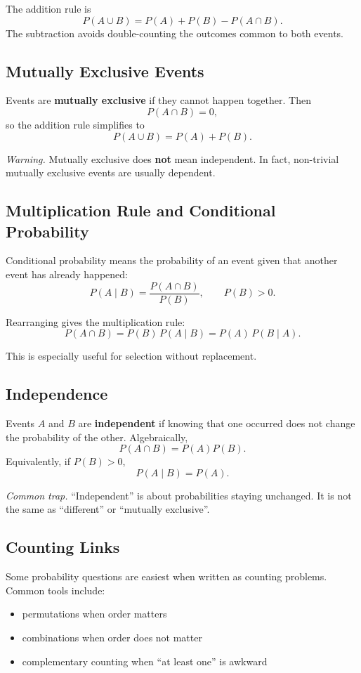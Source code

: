 The addition rule is
\[
P(A\cup B)=P(A)+P(B)-P(A\cap B).
\]
The subtraction avoids double-counting the outcomes common to both events.

\subsection{Mutually Exclusive Events}

Events are \textbf{mutually exclusive} if they cannot happen together. Then
\[
P(A\cap B)=0,
\]
so the addition rule simplifies to
\[
P(A\cup B)=P(A)+P(B).
\]

\textit{Warning.} Mutually exclusive does \textbf{not} mean independent. In fact, non-trivial mutually exclusive events are usually dependent.

\subsection{Multiplication Rule and Conditional Probability}

Conditional probability means the probability of an event given that another event has already happened:
\[
P(A\mid B)=\frac{P(A\cap B)}{P(B)},
\qquad P(B)>0.
\]

Rearranging gives the multiplication rule:
\[
P(A\cap B)=P(B)\,P(A\mid B)=P(A)\,P(B\mid A).
\]

This is especially useful for selection without replacement.

\subsection{Independence}

Events $A$ and $B$ are \textbf{independent} if knowing that one occurred does not change the probability of the other. Algebraically,
\[
P(A\cap B)=P(A)P(B).
\]
Equivalently, if $P(B)>0$,
\[
P(A\mid B)=P(A).
\]

\textit{Common trap.} ``Independent'' is about probabilities staying unchanged. It is not the same as ``different'' or ``mutually exclusive''.

\subsection{Counting Links}

Some probability questions are easiest when written as counting problems. Common tools include:
\begin{itemize}[leftmargin=*]
  \item permutations when order matters
  \item combinations when order does not matter
  \item complementary counting when ``at least one'' is awkward
\end{itemize}

